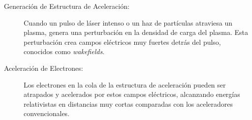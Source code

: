 \begin{description}
    \item[Generación de Estructura de Aceleración: ] Cuando un pulso de láser intenso o un haz de partículas atraviesa un plasma, genera una perturbación en la densidad de carga del plasma. Esta perturbación crea campos eléctricos muy fuertes detrás del pulso, conocidos como \emph{wakefields}.
    \item[Aceleración de Electrones: ] Los electrones en la cola de la estructura de aceleración pueden ser atrapados y acelerados por estos campos eléctricos, alcanzando energías relativistas en distancias muy cortas comparadas con los aceleradores convencionales.
\end{description}






%